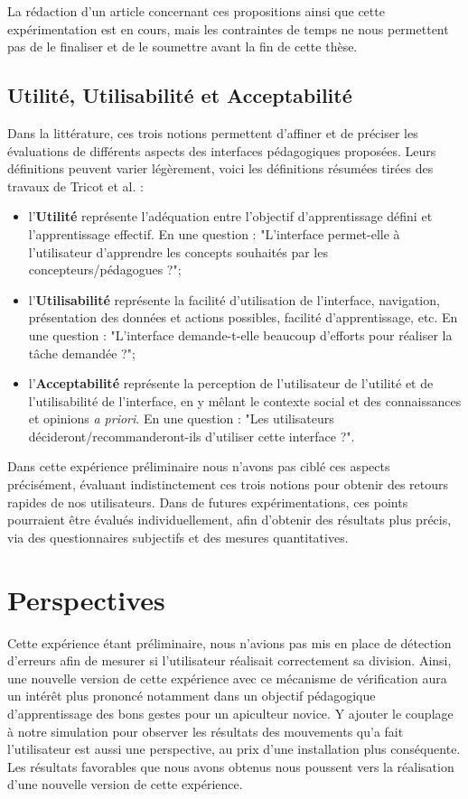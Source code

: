 	 La rédaction d'un article concernant ces propositions ainsi que cette expérimentation est en cours, mais les contraintes de temps ne nous permettent pas de le finaliser et de le soumettre avant la fin de cette thèse.
		
		\subsection{Utilité, Utilisabilité et Acceptabilité}
		Dans la littérature, ces trois notions permettent d'affiner et de préciser les évaluations de différents aspects des interfaces pédagogiques proposées. Leurs définitions peuvent varier légèrement, voici les définitions résumées tirées des travaux de Tricot et al. \cite{tricot_utilite_2003} :
		\begin{itemize}
			\item l'\textbf{Utilité} représente l'adéquation entre l'objectif d'apprentissage défini et l'apprentissage effectif. En une question : "L'interface permet-elle à l'utilisateur d'apprendre les concepts souhaités par les concepteurs/pédagogues ?";
			\item l'\textbf{Utilisabilité} représente la facilité d'utilisation de l'interface, navigation, présentation des données et actions possibles, facilité d'apprentissage, etc. En une question : "L'interface demande-t-elle beaucoup d'efforts pour réaliser la tâche demandée ?";
			\item l'\textbf{Acceptabilité} représente la perception de l'utilisateur de l'utilité et de l'utilisabilité de l'interface, en y mêlant le contexte social et des connaissances et opinions \textit{a priori}. En une question : "Les utilisateurs décideront/recommanderont-ils d'utiliser cette interface ?".
		\end{itemize}
		
		Dans cette expérience préliminaire nous n'avons pas ciblé ces aspects précisément, évaluant indistinctement ces trois notions pour obtenir des retours rapides de nos utilisateurs. Dans de futures expérimentations, ces points pourraient être évalués individuellement, afin d'obtenir des résultats plus précis, via des questionnaires subjectifs et des mesures quantitatives.
	
	\section{Perspectives}
 	Cette expérience étant préliminaire, nous n'avions pas mis en place de détection d'erreurs afin de mesurer si l'utilisateur réalisait correctement sa division. Ainsi, une nouvelle version de cette expérience avec ce mécanisme de vérification aura un intérêt plus prononcé notamment dans un objectif pédagogique d'apprentissage des bons gestes pour un apiculteur novice. Y ajouter le couplage à notre simulation pour observer les résultats des mouvements qu'a fait l'utilisateur est aussi une perspective, au prix d'une installation plus conséquente. Les résultats favorables que nous avons obtenus nous poussent vers la réalisation d'une nouvelle version de cette expérience.
	
